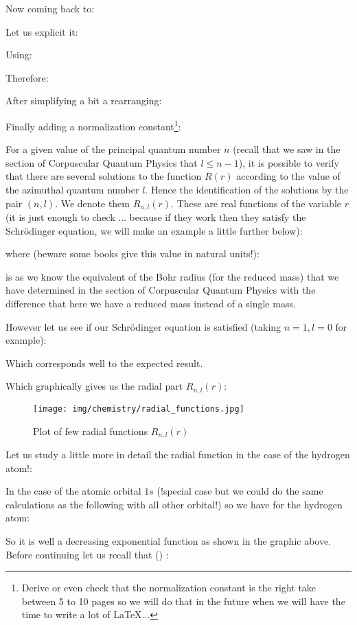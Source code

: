 	Now coming back to:
	
	Let us explicit it:
	
	Using:
	
	Therefore:
	
	After simplifying a bit a rearranging:
	
	Finally adding a normalization constant\footnote{Derive or even check that the normalization constant is the right take between 5 to 10 pages so we will do that in the future when we will have the time to write a lot of \LaTeX ...}:
	
	
	For a given value of the principal quantum number $n$ (recall that we saw in the section of Corpuscular Quantum Physics that $l\leq n-1$), it is possible to verify that there are several solutions to the function $R(r)$ according to the value of the azimuthal quantum number $l$. Hence the identification of the solutions by the pair $(n, l)$. We denote them $R_{n,l}(r)$. These are real functions of the variable $r$ (it is just enough to check ... because if they work then they satisfy the Schrödinger equation, we will make an example a little further below):
	
	where (beware some books give this value in natural units!):
	
	is as we know the equivalent of the Bohr radius (for the reduced mass) that we have determined in the section of Corpuscular Quantum Physics  with the difference that here we have a reduced mass instead of a single mass.
	
	However let us see if our Schrödinger equation is satisfied (taking $n=1,l=0$ for example):
	
	Which corresponds well to the expected result.

	Which graphically gives us the radial part $R_{n,l}(r)$:
	\begin{figure}[H]
		\centering
		\texttt{[image: img/chemistry/radial\_functions.jpg]}	
		\caption{Plot of few radial functions $R_{n,l}(r)$}
	\end{figure}
	Let us study a little more in detail the radial function in the case of the hydrogen atom!:

	In the case of the atomic orbital $1s$ (!special case but we could do the same calculations as the following with all other orbital!) so we have for the hydrogen atom:
	
	So it is well a decreasing exponential function as shown in the graphic above. Before continuing let us recall that () :
	

